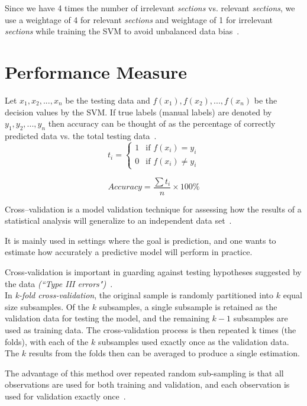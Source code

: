\documentclass[a4paper,10pt]{report}
\begin{document}
Since we have 4 times the number of irrelevant \emph{sections} vs. relevant \emph{sections}, we use a weightage of 4 for relevant \emph{sections} and weightage of 1 for irrelevant \emph{sections} while training the SVM to avoid unbalanced data bias~\cite{weightedsvm}.
\clearpage
\section{Performance Measure}

Let $x_1,x_2,...,x_n$ be the testing data and $f(x_1),f(x_2),...,f(x_n)$ be the decision values by the SVM. If true labels (manual labels) are denoted by $y_1,y_2,...,y_n$ then accuracy can be thought of as the percentage of correctly predicted data vs. the total testing data~\cite{libsvmpaper}.
\[ t_i = \left\{
	\begin{array}{ll}
		1 & \mbox{if } f(x_i) = y_i \\
		0 & \mbox{if } f(x_i) \neq y_i 
	\end{array}
\right. \]


\[ Accuracy = \frac{\sum t_i}{n} \times 100\% \]

\noindent Cross--validation is a model validation technique for assessing how the results of a statistical analysis will generalize to an independent data set~\cite{crossvalidation}. 

It is mainly used in settings where the goal is prediction, and one wants to estimate how accurately a predictive model will perform in practice. 

Cross-validation is important in guarding against testing hypotheses suggested by the data \emph{(``Type III errors")}~\cite{crossvalidation}.\\

\noindent In \emph{k-fold cross-validation}, the original sample is randomly partitioned into $k$ equal size subsamples. 
Of the $k$ subsamples, a single subsample is retained as the validation data for testing the model, 
and the remaining $k - 1$ subsamples are used as training data. The cross-validation process is then repeated k times (the folds), 
with each of the $k$ subsamples used exactly once as the validation data. The $k$ results from the folds then can be averaged
to produce a single estimation. 

The advantage of this method over repeated random sub-sampling is that all observations are 
used for both training and validation, and each observation is used for validation exactly once~\cite{crossvalidation}.\\
\end{document}
